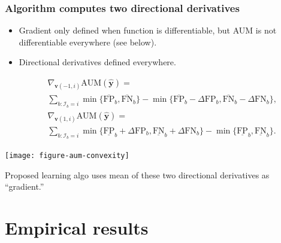 \documentclass[t]{beamer}
\begin{document}
\begin{frame}
  \frametitle{Algorithm computes two directional derivatives }

  \begin{itemize}
  \item Gradient only defined when function is differentiable, but AUM
    is not differentiable everywhere (see below).
  \item Directional derivatives defined everywhere.
  \end{itemize}
\begin{eqnarray*}
  &&\nabla_{\mathbf v(-1,i)} \text{AUM}(\mathbf{\hat y}) = \\
  &&\sum_{b: \mathcal I_b = i}
  \min\{
  \overline{\text{FP}}_b , 
  \overline{\text{FN}}_b 
  \}
  -
  \min\{
  \overline{\text{FP}}_b - \Delta\text{FP}_b, 
  \overline{\text{FN}}_b - \Delta\text{FN}_b
  \},\\
  &&\nabla_{\mathbf v(1,i)} \text{AUM}(\mathbf{\hat y}) = \\
  &&\sum_{b: \mathcal I_b = i}
  \min\{
  \underline{\text{FP}}_b + \Delta\text{FP}_b, 
  \underline{\text{FN}}_b + \Delta\text{FN}_b
  \}
  -
  \min\{
  \underline{\text{FP}}_b , 
  \underline{\text{FN}}_b 
     \}.
\end{eqnarray*}  

\parbox{2in}{ \texttt{[image: figure-aum-convexity]} }
\parbox{2in}{ Proposed learning algo uses mean of these two
  directional derivatives as ``gradient.''  }

\end{frame}


\section{Empirical results}
\end{document}
